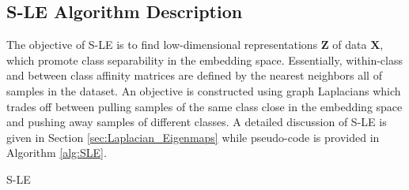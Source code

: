\subsection{S-LE Algorithm Description}
The objective of S-LE \citep{Raducanu2012SupervisedNonlinearDimReduction} is to find low-dimensional representations $\bm{Z}$ of data $\bm{X}$, which promote class separability in the embedding space.  Essentially, within-class and between class affinity matrices are defined by the nearest neighbors all of samples in the dataset.  An objective is constructed using graph Laplacians  which trades off between pulling samples of the same class close in the embedding space and pushing away samples of different classes.   A detailed discussion of S-LE is given in Section \ref{sec:Laplacian_Eigenmaps} while pseudo-code is provided in Algorithm \ref{alg:SLE}.

\begin{algorithm}[h!]
	\caption{S-LE}
	\label{alg:SLE}
	\begin{algorithmic}[1]
		\Else
		\EndIf
		\EndFor
	\end{algorithmic}
\end{algorithm}

